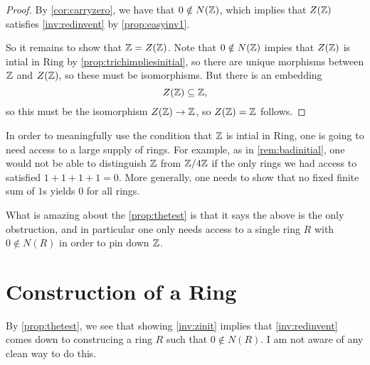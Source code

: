 \documentclass{article}
\begin{document}
\begin{proof}
	By \autoref{cor:carryzero}, we have that $0\notin N(\mathbb Z)$, which implies that $Z(\mathbb Z)$ satisfies \autoref{inv:redinvent} by \autoref{prop:easyinv1}.
	
	So it remains to show that $\mathbb Z=Z(\mathbb Z)$. Note that $0\notin N(\mathbb Z)$ impies that $Z(\mathbb Z)$ is intial in $\mathrm{Ring}$ by \autoref{prop:trichimpliesinitial}, so there are unique morphisms between $\mathbb Z$ and $Z(\mathbb Z),$ so these must be isomorphisms. But there is an embedding
	\[Z(\mathbb Z)\subseteq\mathbb Z,\]
	so this must be the isomorphism $Z(\mathbb Z)\to\mathbb Z$, so $Z(\mathbb Z)=\mathbb Z$ follows.
\end{proof}
\begin{remark}
	In order to meaningfully use the condition that $\mathbb Z$ is intial in $\mathrm{Ring}$, one is going to need access to a large supply of rings. For example, as in \autoref{rem:badinitial}, one would not be able to distinguish $\mathbb Z$ from $\mathbb Z/4\mathbb Z$ if the only rings we had access to satisfied $1+1+1+1=0.$ More generally, one needs to show that no fixed finite sum of $1$s yields $0$ for all rings.

	What is amazing about the \autoref{prop:thetest} is that it says the above is the only obstruction, and in particular one only needs access to a single ring $R$ with $0\notin N(R)$ in order to pin down $\mathbb Z$.
\end{remark}

\section{Construction of a Ring}
By \autoref{prop:thetest}, we see that showing \autoref{inv:zinit} implies that \autoref{inv:redinvent} comes down to construcing a ring $R$ such that $0\notin N(R)$. I am not aware of any clean way to do this.\todo{}

\end{document}
